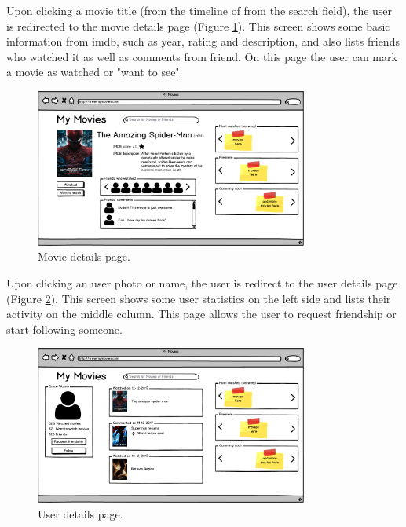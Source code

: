 Upon clicking a movie title (from the timeline of from the search field), the
user is redirected to the movie details page (Figure \ref{fig:movie}). This
screen shows some basic information from imdb, such as year, rating and
description, and also lists friends who watched it as well as comments from
friend. On this page the user can mark a movie as watched or "want to see".

\begin{figure}[!htb]
\centering
\includegraphics[width=0.8\textwidth]{fig/03-movie.png}
\caption{\label{fig:movie}Movie details page.}
\end{figure}

Upon clicking an user photo or name, the user is redirect to the user details
page (Figure \ref{fig:user}). This screen shows some user statistics on the
left side and lists their activity on the middle column. This page allows the
user to request friendship or start following someone.

\begin{figure}[!htb]
\centering
\includegraphics[width=0.8\textwidth]{fig/04-user.png}
\caption{\label{fig:user}User details page.}
\end{figure}





